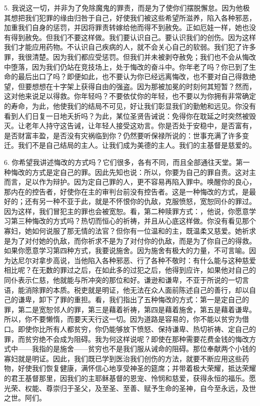 5. 我说这一切，并非为了免除魔鬼的罪责，而是为了使你们摆脱懈怠。因为他极其想把我们犯罪的缘由归咎于自己，好使我们被这些希望所滋养，陷入各种邪恶，加重我们自身的惩罚，并因将罪责转嫁给他而得不到赦免。正如厄娃一样，她也没有得到赦免。但我们不要这样做。我们要认识自己。要认识我们的创伤。因为这样我们才能应用药物。不认识自己疾病的人，就不会关心自己的软弱。我们犯了许多罪，我很清楚。因为我们都应受惩罚。但我们并未被剥夺赦免；我们也不会从悔改中堕落，因为我们仍站在竞技场上，处于悔改的奋斗中。你年老了吗？你已到了生命的最后出口了吗？即便如此，也不要认为你已经远离悔改，也不要对自己得救绝望，但要想想在十字架上获得自由的强盗。因为那被加冕的时刻何其短暂？然而，这对他来说足以得救。你年轻吗？不要依仗你的年轻，也不要以为你拥有非常确定的寿命，为此，他使我们的结局不可见，好让我们彰显我们的勤勉和远见。你没有看到人们日复一日地夭折吗？为此，某位圣贤告诫说：免得你在耽延之时突然被毁灭。让老年人持守这告诫，让年轻人接受这劝言。你是否处于安稳中，是否富有，是否财富丰盈，是否没有灾祸临到你？仍然要听保禄所说的：世事充满了许多变迁。我们不是自己结局的主人。让我们成为美德的主人。我们的主基督是慈爱的。\par

6. 你希望我讲述悔改的方式吗？它们很多，各有不同，而且全部通往天堂。第一种悔改的方式是定自己的罪。因此先知也说：所以，你要为自己的罪自责。这对主而言，足以作为辩护。因为定自己罪的人，更不容易再陷入罪中。唤醒你的良心，那内在的控告者，好使你在主的审判台前没有控告者。这是一种悔改的方式，是最好的；还有另一种不亚于此，就是不怀恨你的仇敌，克服愤怒，宽恕同仆的罪过。因为这样，我们冒犯主的罪也会被宽恕。看，第二种赎罪方式：，他说，你愿意学习第三种悔改的方式吗？热切而恒心的祈祷，并且从心底这样做。你没有看见那个寡妇，她如何说服了那无情的法官？但你有一位温和的主，既温柔又慈爱。她祈求是为了对付她的仇敌，而你祈求不是为了对付你的仇敌，而是为了你自己的得救。如果你愿意学习第四种方式，我要说施舍。因为施舍有极大的力量，不可言喻。因为达尼尔对拿步高说，当他陷入各种邪恶、行了各种不敬时：有什么能与这种慈爱相比呢？在无数的罪过之后，在如此多的过犯之后，他得到应许，如果他对自己的同仆表示仁慈，他就能与所冲突的那位和好。谦逊和谦卑，不亚于所说的一切言语，能消除罪的本质。税吏就是明证，他无法在众人面前陈述自己的善行，却以自己的谦卑，卸下了罪的重担。看，我们指出了五种悔改的方式：第一是定自己的罪，第二是宽恕邻人的罪，第三是藉着祈祷，第四是藉着施舍，第五是藉着谦卑。所以，你不要懒惰，而要天天行这一切。因为道路是容易的，你不能以贫穷为借口。即使你比所有人都贫穷，你仍能够放下愤怒、保持谦卑、热切祈祷、定自己的罪，而贫穷绝不会成为阻碍。我为何这样说呢？即使在那种需要花费金钱的悔改方式中——我指的是施舍——贫穷也不是我们服从诫命的阻碍。那位奉献两个小钱的寡妇就是明证。因此，我们既已学到医治我们创伤的方法，就要不断应用这些药物，好使我们恢复健康，满怀信心地享受神圣的筵席；并带着极大荣耀，抵达荣耀的君王基督那里，因我们的主耶稣基督的恩宠、怜悯和慈爱，获得永恒的福乐。愿光荣、权能、尊崇归于圣父，及至圣、至善、赋予生命的圣神，自今至永远，及世之世。阿们。\par

